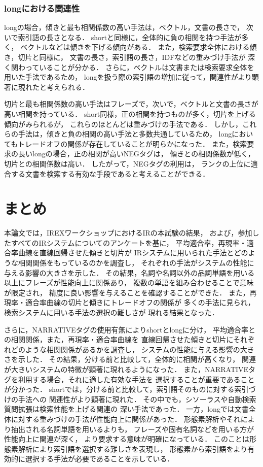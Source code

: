\subsubsection*{longにおける関連性}
longの場合，傾きと最も相関係数の高い手法は，ベクトル，文書の長さで，
次いで索引語の長さとなる．
shortと同様に，全体的に負の相関を持つ手法が多く，
ベクトルなどは傾きを下げる傾向がある．
また，検索要求全体における傾き，切片と同様に，
文書の長さ，索引語の長さ，IDFなどの重みづけ手法が
深く関わっていることが分かる．
さらに，ベクトルは文書または検索要求全体を用いた手法であるため，
longを扱う際の索引語の増加に従って，関連性がより顕著に現れたと考えられる．

切片と最も相関係数の高い手法はフレーズで，次いで，ベクトルと文書の長さが
高い相関を持っている．
short同様，正の相関を持つものが多く，切片を上げる傾向がみられるが，
これらのほとんどは重みづけの手法である．
しかし，これらの手法は，傾きと負の相関の高い手法と多数共通しているため，
longにおいてもトレードオフの関係が存在していることが明らかになった．
また，検索要求の長いlongの場合，正の相関が高いNEGタグは，
傾きとの相関係数が低く，切片との相関係数は高い．
したがって，NEGタグの利用は，
ランクの上位に適合する文書を検索する有効な手段であると考えることができる．


\section{まとめ}
本論文では，IREXワークショップにおけるIRの本試験の結果，
および，参加したすべてのIRシステムについてのアンケートを基に，
平均適合率，再現率・適合率曲線を直線回帰させた傾きと切片が
IRシステムに用いられた手法とどのような相関関係をもっているのかを調査し，
それぞれの手法がシステムの性能に与える影響の大きさを示した．
その結果，名詞や名詞以外の品詞単語を用いる以上にフレーズが性能向上に関係あり，
複数の単語を組み合わせることで意味が限定され，
精度に良い影響を与えることを確認することができた．
また，再現率・適合率曲線の切片と傾きにトレードオフの関係が
多くの手法に見られ，検索システムに用いる手法の選択の難しさが
現れる結果となった．

さらに，NARRATIVEタグの使用有無によりshortとlongに分け，
平均適合率との相関関係，また，再現率・適合率曲線を
直線回帰させた傾きと切片にそれぞれどのような相関関係があるかを調査し，
システムの性能に与える影響の大きさを示した．
その結果，分ける前と比較して，全体的に相関が高くなり，
関連が大きいシステムの特徴が顕著に現れるようになった．
また，NARRATIVEタグを利用する場合，それに適した有効な手法を
選択することが重要であることが分かった．
shortでは，分ける前と比較して，索引語そのものに対する索引づけの手法への
関連性がより顕著に現れた．
その中でも，シソーラスや自動検索質問拡張は検索性能を上げる関連の
深い手法であった．
一方，longでは文書全体に対する重みづけの手法が性能向上に関係があった．
形態素解析やそれにより抽出される名詞単語を用いるよりも，
フレーズや固有名詞などを用いる方が性能向上に関連が深く，
より要求する意味が明確になっている．
このことは形態素解析により索引語を選択する難しさを表現し，
形態素から索引語をより有効的に選択する手法が必要であることを示している．

